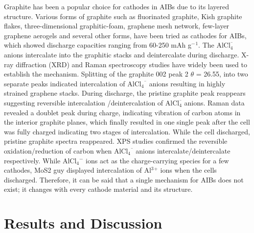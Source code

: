 \documentclass[num-refs]{wiley-article}
\begin{document}
Graphite has been a popular choice for cathodes in AIBs due to its layered structure. Various forms of graphite such as fluorinated graphite\cite{rani_fluorinated_2013}, Kish graphite flakes\cite{wang_kish_2017}, three-dimensional graphitic-foam\cite{lin_ultrafast_2015}, graphene mesh network\cite{chen_ultrafast_2017}, few-layer graphene aerogels\cite{qiao_defect-free_2019} and several other forms, have been tried as cathodes for AIBs, which showed discharge capacities ranging from 60-250 mAh g$^-{^1}$. The AlCl$_4^¯$ anions intercalate into the graphitic stacks and deintercalate during discharge. X-ray diffraction (XRD) and Raman spectroscopy studies have widely been used to establish the mechanism\cite{wang_advanced_2017}. Splitting of the graphite 002 peak 2 $\theta$ = 26.55, into two separate peaks indicated intercalation of AlCl$_4{^¯}$ anions resulting in highly strained graphene stacks.  During discharge, the pristine graphite peak reappears suggesting reversible intercalation /deintercalation of AlCl$_4^¯$ anions. Raman data revealed a doublet peak during charge, indicating vibration of carbon atoms in the interior graphite planes, which finally resulted in one single peak after the cell was fully charged indicating two stages of intercalation. While the cell discharged, pristine graphite spectra reappeared. XPS studies confirmed the reversible oxidation/reduction of carbon when AlCl$_4{^¯}$ anions intercalate/deintercalate respectively. While AlCl$_4{^-}$ ions act as the charge-carrying species for a few cathodes, MoS2 guy displayed intercalation of Al$^3{^+}$ ions when the cells discharged. Therefore, it can be said that a single mechanism for AIBs does not exist; it changes with every cathode material and its structure. 


\section{Results and Discussion}
\end{document}
